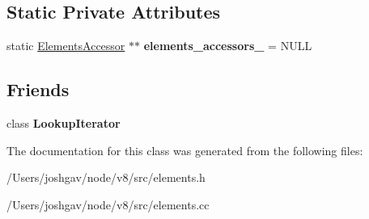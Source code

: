 \subsection*{Static Private Attributes}
\begin{DoxyCompactItemize}
\item 
static \hyperlink{classv8_1_1internal_1_1_elements_accessor}{Elements\+Accessor} $\ast$$\ast$ {\bfseries elements\+\_\+accessors\+\_\+} = N\+U\+LL\hypertarget{classv8_1_1internal_1_1_elements_accessor_a701439135c60cf5c3619544af865f49e}{}\label{classv8_1_1internal_1_1_elements_accessor_a701439135c60cf5c3619544af865f49e}

\end{DoxyCompactItemize}
\subsection*{Friends}
\begin{DoxyCompactItemize}
\item 
class {\bfseries Lookup\+Iterator}\hypertarget{classv8_1_1internal_1_1_elements_accessor_a44f614b48d67bab95d53634a26593e69}{}\label{classv8_1_1internal_1_1_elements_accessor_a44f614b48d67bab95d53634a26593e69}

\end{DoxyCompactItemize}


The documentation for this class was generated from the following files\+:\begin{DoxyCompactItemize}
\item 
/\+Users/joshgav/node/v8/src/elements.\+h\item 
/\+Users/joshgav/node/v8/src/elements.\+cc\end{DoxyCompactItemize}
